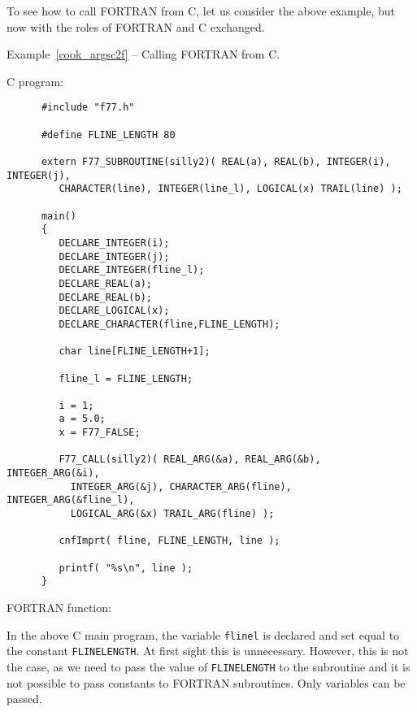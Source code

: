 \documentclass[twoside,11pt]{article}
\newcommand{\latex}[1]{#1}
\renewcommand{\_}{\texttt{\symbol{95}}}
\newcounter{examples}
\begin{document}
To see how to call FORTRAN from C, let us consider the above example, but now
with the roles of FORTRAN and C exchanged.

\label{cook_argsc2f}
\begin{center}
Example\latex{~\ref{cook_argsc2f}}
-- Calling FORTRAN from C\@.
\end{center}
\nopagebreak[4]
C program:
{\small \begin{verbatim}
      #include "f77.h"

      #define FLINE_LENGTH 80
      
      extern F77_SUBROUTINE(silly2)( REAL(a), REAL(b), INTEGER(i), INTEGER(j),
         CHARACTER(line), INTEGER(line_l), LOGICAL(x) TRAIL(line) );

      main()
      {
         DECLARE_INTEGER(i);
         DECLARE_INTEGER(j);
         DECLARE_INTEGER(fline_l);
         DECLARE_REAL(a);
         DECLARE_REAL(b);
         DECLARE_LOGICAL(x);
         DECLARE_CHARACTER(fline,FLINE_LENGTH);

         char line[FLINE_LENGTH+1];

         fline_l = FLINE_LENGTH;

         i = 1;
         a = 5.0;
         x = F77_FALSE;

         F77_CALL(silly2)( REAL_ARG(&a), REAL_ARG(&b), INTEGER_ARG(&i),
           INTEGER_ARG(&j), CHARACTER_ARG(fline), INTEGER_ARG(&fline_l),
           LOGICAL_ARG(&x) TRAIL_ARG(fline) );

         cnfImprt( fline, FLINE_LENGTH, line );

         printf( "%s\n", line );
      }
\end{verbatim} }
\pagebreak[3]
FORTRAN function:

In the above C main program, the variable \texttt{fline\_l} is declared and set
equal to the constant {\tt FLINE\_LENGTH}. At first sight this is unnecessary.
However, this is not the case, as we need to pass the value of
\texttt{FLINE\_LENGTH} to the subroutine and it is not possible to pass 
constants to FORTRAN subroutines. Only variables can be passed.
\end{document}
